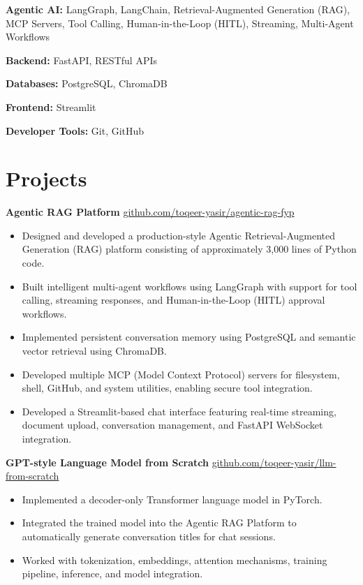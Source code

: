 \documentclass[11pt,a4paper]{article}
\newcommand{\resumeSection}[1]{
    \section*{#1}
}
\newcommand{\resumeItem}[1]{
    \item #1
}
\newcommand{\projectHeading}[3]{
    \textbf{#1}
    \hfill
    \href{#2}{#3}
}
\begin{document}
\vspace{2pt}

\textbf{Agentic AI:}
LangGraph, LangChain, Retrieval-Augmented Generation (RAG), MCP Servers, Tool Calling, Human-in-the-Loop (HITL), Streaming, Multi-Agent Workflows
\vspace{2pt}

\textbf{Backend:}
FastAPI, RESTful APIs

\vspace{2pt}

\textbf{Databases:}
PostgreSQL, ChromaDB

\vspace{2pt}

\textbf{Frontend:}
Streamlit

\vspace{2pt}

\textbf{Developer Tools:}
Git, GitHub



\resumeSection{Projects}

\projectHeading
{Agentic RAG Platform}
{https://github.com/toqeer-yasir/agentic-rag-fyp}{github.com/toqeer-yasir/agentic-rag-fyp}

\begin{itemize}
    \resumeItem{Designed and developed a production-style Agentic Retrieval-Augmented Generation (RAG) platform consisting of approximately 3,000 lines of Python code.}
    \resumeItem{Built intelligent multi-agent workflows using LangGraph with support for tool calling, streaming responses, and Human-in-the-Loop (HITL) approval workflows.}
    \resumeItem{Implemented persistent conversation memory using PostgreSQL and semantic vector retrieval using ChromaDB.}
    \resumeItem{Developed multiple MCP (Model Context Protocol) servers for filesystem, shell, GitHub, and system utilities, enabling secure tool integration.}
    \resumeItem{Developed a Streamlit-based chat interface featuring real-time streaming, document upload, conversation management, and FastAPI WebSocket integration.}
\end{itemize}

\vspace{6pt}

\projectHeading
{GPT-style Language Model from Scratch}
{https://github.com/toqeer-yasir/llm-from-scratch}{github.com/toqeer-yasir/llm-from-scratch}

\begin{itemize}
    \resumeItem{Implemented a decoder-only Transformer language model in PyTorch.}
    \resumeItem{Integrated the trained model into the Agentic RAG Platform to automatically generate conversation titles for chat sessions.}
    \resumeItem{Worked with tokenization, embeddings, attention mechanisms, training pipeline, inference, and model integration.}
\end{itemize}
\end{document}
